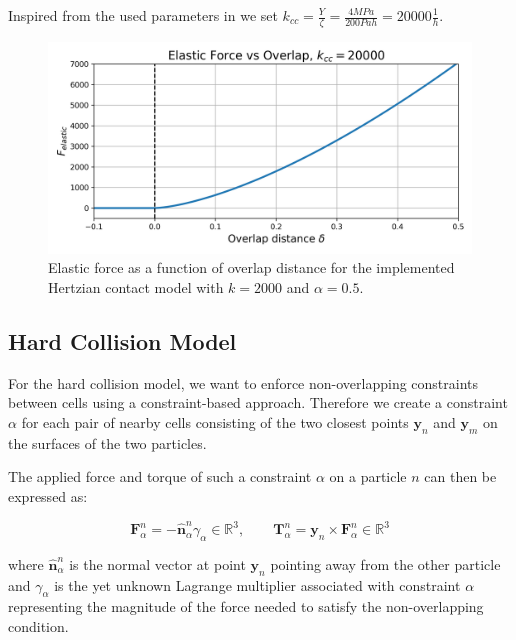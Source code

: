 \documentclass[conference]{IEEEtran}
\begin{document}
Inspired from the used parameters in \cite{You2018} we set $k_{cc} = \frac{Y}{\zeta} = \frac{4 MPa}{200 Pa h} = 20000 \frac{1}{h}$.



\begin{figure}[H]
    \centering
    \includegraphics[width=\linewidth]{figures/hertzian_contact_model.png}
    \caption{Elastic force as a function of overlap distance for the implemented Hertzian contact model with $k=2000$ and $\alpha=0.5$.}
    \label{fig:hertzian_contact_model}
\end{figure}

\newpage
\subsection{Hard Collision Model}


For the hard collision model, we want to enforce non-overlapping constraints between cells using a constraint-based approach. Therefore we create a constraint $\alpha$ for each pair of nearby cells consisting of the two closest points $\mathbf{y}_n$ and $\mathbf{y}_m$ on the surfaces of the two particles.

The applied force and torque of such a constraint $\alpha$ on a particle $n$ can then be expressed as:

$$
    \mathbf{F}_\alpha^n = - \hat{\mathbf{n}}_\alpha ^n \gamma_\alpha \in \mathbb{R}^3, \qquad \mathbf{T}_\alpha^n = \mathbf{y}_n \times \mathbf{F}_\alpha^n \in \mathbb{R}^3
$$
\label{eq:constraint_force}

where $\hat{\mathbf{n}}_\alpha ^n$ is the normal vector at point $\mathbf{y}_n$ pointing away from the other particle and $\gamma_\alpha$ is the yet unknown Lagrange multiplier associated with constraint $\alpha$ representing the magnitude of the force needed to satisfy the non-overlapping condition.
\end{document}
